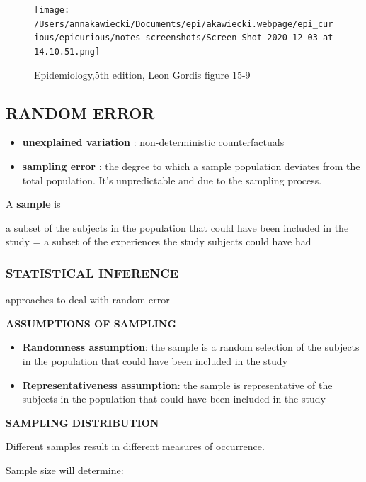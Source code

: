 \documentclass[
]{article}
\begin{document}
\begin{figure}
\centering
\texttt{[image: /Users/annakawiecki/Documents/epi/akawiecki.webpage/epi\_curious/epicurious/notes screenshots/Screen Shot 2020-12-03 at 14.10.51.png]}
\caption{Epidemiology,5th edition, Leon Gordis figure 15-9}
\end{figure}

\hypertarget{random-error}{%
\subsection{RANDOM ERROR}\label{random-error}}

\begin{itemize}
\item
  \textbf{unexplained variation} : non-deterministic counterfactuals
\item
  \textbf{sampling error} : the degree to which a sample population
  deviates from the total population. It's unpredictable and due to the
  sampling process.
\end{itemize}

A \textbf{sample} is

a subset of the subjects in the population that could have been included
in the study = a subset of the experiences the study subjects could have
had

\hypertarget{statistical-inference}{%
\subsubsection{STATISTICAL INFERENCE}\label{statistical-inference}}

approaches to deal with random error

\textbf{ASSUMPTIONS OF SAMPLING}

\begin{itemize}
\item
  \textbf{Randomness assumption}: the sample is a random selection of
  the subjects in the population that could have been included in the
  study
\item
  \textbf{Representativeness assumption}: the sample is representative
  of the subjects in the population that could have been included in the
  study
\end{itemize}

\textbf{SAMPLING DISTRIBUTION}

Different samples result in different measures of occurrence.

Sample size will determine:
\end{document}
